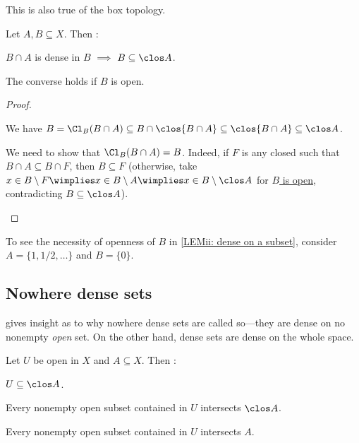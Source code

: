 	\begin{rmk}
		This is also true of the box topology.
	\end{rmk}
	
	
	
	\begin{lem}\label{LEM: dense on a subset}
		Let $A, B\subseteq X$. Then \tfh:
		\begin{mylist}
			\item $B\cap A$ is dense in $B$ $\implies$ $B\subseteq \clos A$.
			
			\item\label{LEMii: dense on a subset} The converse holds if $B$ is open.
		\end{mylist}
	\end{lem}
	
	\begin{proof}
		\begin{mylist}
			\item We have $B = \Cl_B(B\cap A)\subseteq B\cap \clos{B\cap A}\subseteq\clos{B\cap A}\subseteq\clos A$.
			
			\item We need to show that $\Cl_B(B\cap A) = B$. Indeed, if $F$ is any closed such that $B\cap A\subseteq B\cap F$, then $B\subseteq F$ (otherwise, take $x\in B\setminus F\wimplies x\in B\setminus A\wimplies x\in B\setminus \clos A$ for \uline{$B$ is open}, contradicting $B\subseteq \clos A$).\qedhere
		\end{mylist}
	\end{proof}
	
	\begin{rmk}
		To see the necessity of openness of $B$ in \ref{LEMii: dense on a subset}, consider $A = \{1, 1/2, \ldots\}$ and $B = \{0\}$.
	\end{rmk}
	
	
	
\subsection{Nowhere dense sets}
	
	 gives insight as to why nowhere dense sets are called so---they are dense on no nonempty \emph{open} set. On the other hand, dense sets are dense on the whole space.
	
	\begin{lem}
		Let $U$ be open in $X$ and $A\subseteq X$. Then \tfae:
		\begin{mylist}
			\item $U\subseteq \clos A$.
			
			\item Every nonempty open subset contained in $U$ intersects $\clos A$.
			
			\item Every nonempty open subset contained in $U$ intersects $A$.
		\end{mylist}
	\end{lem}
	
